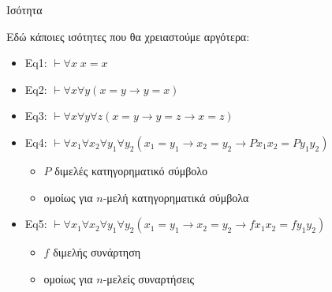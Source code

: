 \documentclass{beamer}
\begin{document}
\begin{frame}{Ισότητα}
  \begin{block}{}
    Εδώ κάποιες ισότητες που θα χρειαστούμε αργότερα:
    \begin{itemize}
      \item Eq1: $\vdash \forall x \; x = x$
      \item Eq2: $\vdash \forall x \forall y (x = y \rightarrow y = x)$
      \item Eq3: $\vdash \forall x \forall y \forall z (x = y \rightarrow y = z \rightarrow x = z)$
      \item Eq4: $\vdash \forall x_1 \forall x_2 \forall y_1 \forall y_2 (x_1 = y_1 \rightarrow x_2 = y_2 \rightarrow Px_1x_2 = Py_1y_2)$
        \begin{itemize}
          \item $P$ διμελές κατηγορηματικό σύμβολο
          \item ομοίως για $n$-μελή κατηγορηματικά σύμβολα
        \end{itemize}
      \item Eq5: $\vdash \forall x_1 \forall x_2 \forall y_1 \forall y_2 (x_1 = y_1 \rightarrow x_2 = y_2 \rightarrow fx_1x_2 = fy_1y_2)$
        \begin{itemize}
          \item $f$ διμελής συνάρτηση
          \item ομοίως για $n$-μελείς συναρτήσεις
        \end{itemize}
    \end{itemize}
  \end{block}
\end{frame}
\end{document}
